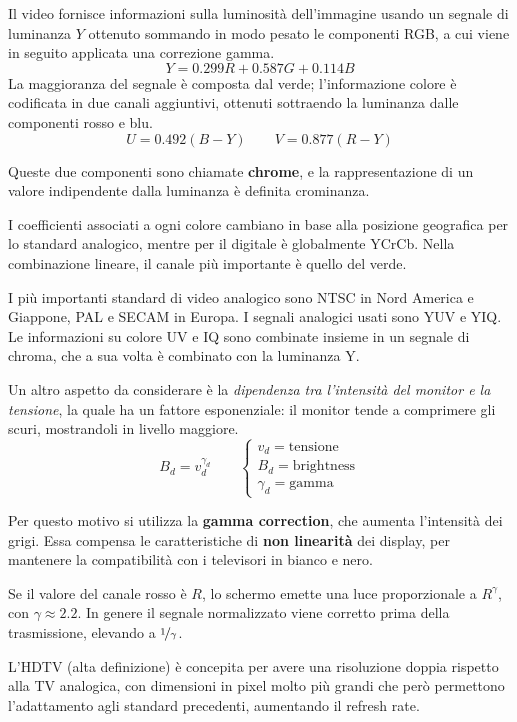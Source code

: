Il video fornisce informazioni sulla luminosità dell'immagine usando un segnale di luminanza $Y$ ottenuto sommando in modo pesato le componenti RGB, a cui viene in seguito applicata una correzione gamma. 
$$ Y = 0.299R + 0.587G + 0.114B$$
La maggioranza del segnale è composta dal verde; l'informazione colore è codificata in due canali aggiuntivi, ottenuti sottraendo la luminanza dalle componenti rosso e blu.
$$ U = 0.492(B - Y) \qquad V = 0.877(R - Y)$$

Queste due componenti sono chiamate \textbf{chrome}, e la rappresentazione di un valore indipendente dalla luminanza è definita crominanza. 

I coefficienti associati a ogni colore cambiano in base alla posizione geografica per lo standard analogico, mentre per il digitale è globalmente YCrCb. Nella combinazione lineare, il canale più importante è quello del verde. 

I più importanti standard di video analogico sono NTSC in Nord America e Giappone, PAL e SECAM in Europa. I segnali analogici usati sono YUV e YIQ. Le informazioni su colore UV e IQ sono combinate insieme in un segnale di chroma, che a sua volta è combinato con la luminanza Y.

Un altro aspetto da considerare è la \textit{dipendenza tra l'intensità del monitor e la tensione}, la quale ha un fattore esponenziale: il monitor tende a comprimere gli scuri, mostrandoli in livello maggiore.
$$B_d = v_d^{\gamma_d} \qquad \begin{cases}
v_d = \text{tensione} \\
B_d = \text{brightness} \\
\gamma_d = \text{gamma}
\end{cases}$$

Per questo motivo si utilizza la \textbf{gamma correction}, che aumenta l'intensità dei grigi. Essa compensa le caratteristiche di \textbf{non linearità} dei display, per mantenere la compatibilità con i televisori in bianco e nero.

Se il valore del canale rosso è $R$, lo schermo emette una luce proporzionale a $R^\gamma$, con $\gamma \approx 2.2$. In genere il segnale normalizzato viene corretto prima della trasmissione, elevando a $\nicefrac{1}{\gamma}$.

L'HDTV (alta definizione) è concepita per avere una risoluzione doppia rispetto alla TV analogica, con dimensioni in pixel molto più grandi che però permettono l'adattamento agli standard precedenti, aumentando il refresh rate. 

